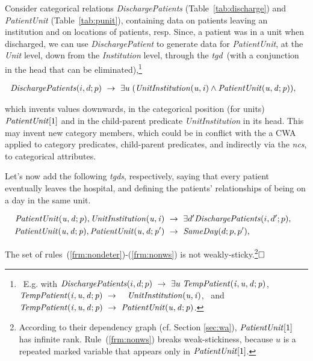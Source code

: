 \documentclass[format=acmsmall, review=false, screen=true]{acmart}
\newcommand{\ignore}[1]{}
\newcommand{\boxtheorem}{\ensuremath{\hfill \Box}}
\newcommand{\nit}[1]{{\it #1}}
\newcommand{\dpm}{{Datalog}$^\pm$}
\newcommand{\cwa}{CWA}
\newcommand{\tgds}{{\em tgds}}
\newcommand{\tgd}{{\em tgd}}
\newcommand{\ncs}{{\em ncs}}
\begin{document}
\begin{example} \label{ex:udown} Consider categorical relations {\it DischargePatients} (Table~\ref{tab:discharge}) and {\it PatientUnit} (Table~\ref{tab:punit}), containing data on patients leaving an institution and on locations of patients, resp. Since, a patient was in a unit when discharged, we can use {\it DischargePatient} to generate data for {\it PatientUnit}, at the {\it Unit} level, down from the {\it Institution} level, through the \tgd \ (with a conjunction in the head that can be eliminated),\footnote{\ E.g. with  ${\it DischargePatients}(i,d;p) ~\rightarrow~ \exists u\;{\it TempPatient(i,u,d;p)}$, \
${\it TempPatient(i,u,d;p)} ~\rightarrow$ ~ ${\it UnitInstitution(u,i)}$, \ and \
${\it TempPatient(i,u,d;p)} ~\rightarrow~ {\it PatientUnit(u,d;p)}$.}

\vspace{-4mm}
\begin{align}
\hspace{-3mm}{\it DischargePatients}(i,d;p) ~\rightarrow~ \exists u\;({\it UnitInstitution(u,i)} \wedge {\it PatientUnit(u,d;p)}),\label{frm:nondeter}
\end{align}
\vspace{-4mm}

\noindent which invents values downwards, in the categorical position (for units) $\nit{PatientUnit}[1]$ and in the child-parent predicate \nit{UnitInstitution} in its head. \ignore{The $\exists$-variable $u$ in (\ref{frm:nondeter})  appears in the ``downward" attribute of the child-parent relation {\it UnitInstitution}, which} This may  invent new category members, which could be in conflict with the a CWA applied to \ignore{. According to the semantics of \dpm, this leads to {\em open world assumption} (OWA)~\cite{reiter} for} category predicates, child-parent predicates, and indirectly via the \ncs, to categorical attributes. %

Let's now add the following  \tgds, respectively, saying that every patient eventually leaves the hospital, and defining the patients' relationships of being on a day in the same unit.

\vspace{-4mm}
\begin{align}
\hspace{-3mm}{\it PatientUnit(u,d;p)},{\it UnitInstitution(u,i)} ~&\rightarrow~ \exists d'{\it DischargePatients}(i,d';p),\label{frm:upnondeter}\\
\hspace{-3mm}{\it PatientUnit(u,d;p)},{\it PatientUnit(u,d;p')} ~&\rightarrow~ {\it SameDay}(d;p,p'),\label{frm:nonws}
\end{align}

The set of rules~(\ref{frm:nondeter})-(\ref{frm:nonws}) is not weakly-sticky.\footnote{According to their dependency graph (cf. Section \ref{sec:wa}), ${\it PatientUnit}[1]$ has infinite rank. Rule~(\ref{frm:nonws}) breaks weak-stickiness, because $u$ is a repeated marked variable that appears only in ${\it PatientUnit}[1]$.}\boxtheorem\end{example}
\end{document}
